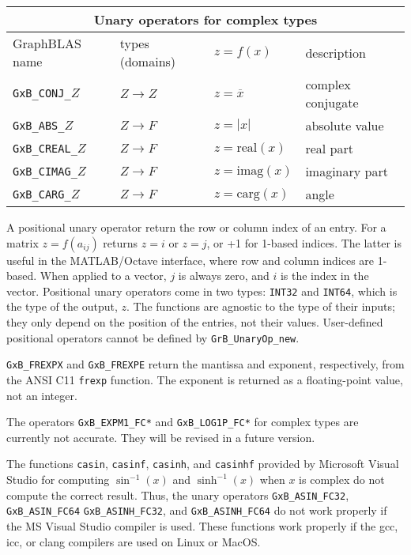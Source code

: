 \documentclass[12pt]{article}
\begin{document}
{\begin{tabular}{|llll|}
\hline
\multicolumn{4}{|c|}{Unary operators for complex types} \\
\hline
GraphBLAS name          & types (domains)   & $z=f(x)$      & description \\
\hline
\verb'GxB_CONJ_'$Z$    & $Z \rightarrow Z$ & $z = \overline{x}$     & complex conjugate \\
\verb'GxB_ABS_'$Z$     & $Z \rightarrow F$ & $z = |x|$              & absolute value \\
\verb'GxB_CREAL_'$Z$   & $Z \rightarrow F$ & $z = \mbox{real}(x)$   & real part \\
\verb'GxB_CIMAG_'$Z$   & $Z \rightarrow F$ & $z = \mbox{imag}(x)$   & imaginary part \\
\verb'GxB_CARG_'$Z$    & $Z \rightarrow F$ & $z = \mbox{carg}(x)$   & angle \\
\hline
\end{tabular}
}
\vspace{0.2in}

A positional unary operator return the row or column index of an entry.  For a
matrix $z=f(a_{ij})$ returns $z = i$ or $z = j$, or +1 for 1-based indices.
The latter is useful in the MATLAB/Octave interface, where row and column indices are
1-based.  When applied to a vector, $j$ is always zero, and $i$ is the index in
the vector.  Positional unary operators come in two types: \verb'INT32' and
\verb'INT64', which is the type of the output, $z$.  The functions are agnostic
to the type of their inputs; they only depend on the position of the entries,
not their values.
User-defined positional operators cannot be defined by \verb'GrB_UnaryOp_new'.

\verb'GxB_FREXPX' and \verb'GxB_FREXPE' return the mantissa and exponent,
respectively, from the ANSI C11 \verb'frexp' function.  The exponent is
returned as a floating-point value, not an integer.

The operators \verb'GxB_EXPM1_FC*' and \verb'GxB_LOG1P_FC*' for complex
types are currently not accurate.  They will be revised in a future version.

The functions \verb'casin', \verb'casinf', \verb'casinh', and \verb'casinhf'
provided by Microsoft Visual Studio for computing $\sin^{-1}(x)$ and
$\sinh^{-1}(x)$ when $x$ is complex do not compute the correct result.  Thus,
the unary operators \verb'GxB_ASIN_FC32', \verb'GxB_ASIN_FC64'
\verb'GxB_ASINH_FC32', and \verb'GxB_ASINH_FC64' do not work properly if the MS
Visual Studio compiler is used.  These functions work properly if the gcc, icc,
or clang compilers are used on Linux or MacOS.
\end{document}
